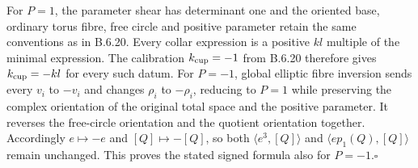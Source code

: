 For $P=1$, the parameter shear has determinant one and the oriented base,
ordinary torus fibre, free circle and positive parameter retain the same
conventions as in B.6.20. Every collar expression is a positive $kl$
multiple of the minimal expression. The calibration $k_{\rm cup}=-1$
from B.6.20 therefore gives $k_{\rm cup}=-kl$ for every such datum.
For $P=-1$, global elliptic fibre inversion sends every $v_i$ to $-v_i$
and changes $\rho_i$ to $-\rho_i$, reducing to $P=1$ while preserving
the complex orientation of the original total space and the positive
parameter. It reverses the free-circle orientation and the quotient
orientation together. Accordingly $e\mapsto-e$ and $[Q]\mapsto-[Q]$,
so both $\langle e^3,[Q]\rangle$ and
$\langle ep_1(Q),[Q]\rangle$ remain unchanged. This proves the stated
signed formula also for $P=-1$.\hfill$\square$
